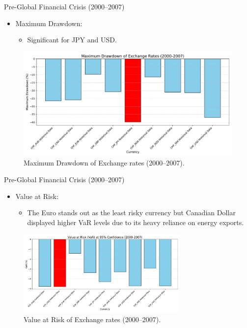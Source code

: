 \documentclass{beamer}
\begin{document}
\begin{frame}{Pre-Global Financial Crisis (2000--2007)}
  \begin{itemize}
    \item Maximum Drawdown:
    \begin{itemize}
      \item Significant for JPY and USD.
    \end{itemize}
   \end{itemize}

    \begin{figure}
    \centering
        \includegraphics[width=0.75
        \textwidth]{../../images/maximum_drawdown_2000_2007.pdf}
        \caption{Maximum Drawdown of Exchange rates (2000--2007).}
        \label{fig:question}
    \end{figure}
\end{frame}

\begin{frame}{Pre-Global Financial Crisis (2000--2007)}
  \begin{itemize}
    \item Value at Risk:
    \begin{itemize}
      \item The Euro stands out as the least risky currency but Canadian Dollar displayed higher VaR levels due to its heavy reliance on energy exports.
    \end{itemize}
   \end{itemize}

    \begin{figure}[h!]
    \centering
    \includegraphics[width=0.75\textwidth]{../../images/var_2000_2007.pdf}
    \caption{Value at Risk of Exchange rates (2000--2007).}
    \label{fig:var_2000_2007}
\end{figure}
    
\end{frame}
\end{document}
